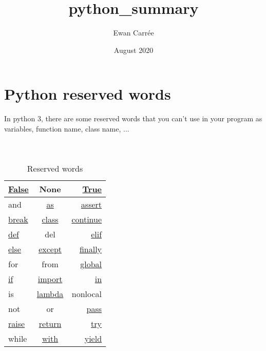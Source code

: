 \documentclass[a4paper, 12pt]{article}
\title{\textbf{python\_summary}}
\author{Ewan Carrée}
\date{August 2020}
\begin{document}
\maketitle
\newpage

\tableofcontents

\newpage
\section{Python reserved words}
In python 3, there are some reserved words that you can't use in your program as variables, function name, class name, ... \\ \\ \\

\begin{table}[h]
\begin{center}
{\renewcommand{\arraystretch}{2} %
{\setlength{\tabcolsep}{1.5cm} %
\begin{tabular}{|l|c|r|}
  \hline
  \hyperref[subsec:Bool]{False} & None & \hyperref[subsec:Bool]{True} \\
  \hline
  and & \hyperref[As]{as} & \hyperref[subsec:Assertion]{assert} \\
  \hline
  \hyperref[subsec:BCPR]{break} & \hyperref[sec:Class]{class} & \hyperref[subsec:BCPR]{continue} \\
  \hline
  \hyperref[sec:Function]{def} & del & \hyperref[IEE]{elif} \\
  \hline
  \hyperref[IEE]{else} & \hyperref[TEEF]{except} & \hyperref[TEEF]{finally} \\
  \hline
  for & from & \hyperref[subsec:Global]{global} \\
  \hline
  \hyperref[IEE]{if} & \hyperref[subsec:Import]{import} & \hyperref[subsec:ListComprehension]{in} \\
  \hline
  is & \hyperref[subsec:Lambda]{lambda} & nonlocal \\
  \hline 
  not & or & \hyperref[subsec:BCPR]{pass} \\
  \hline 
  \hyperref[Raise]{raise} & \hyperref[subsec:BCPR]{return} & \hyperref[TEEF]{try} \\
  \hline
  while & \hyperref[subsec:ContextManager]{with} & \hyperref[sec:Generators]{yield} \\
  \hline
\end{tabular}}}
\end{center}
\caption{Reserved words}
\end{table}
\end{document}

